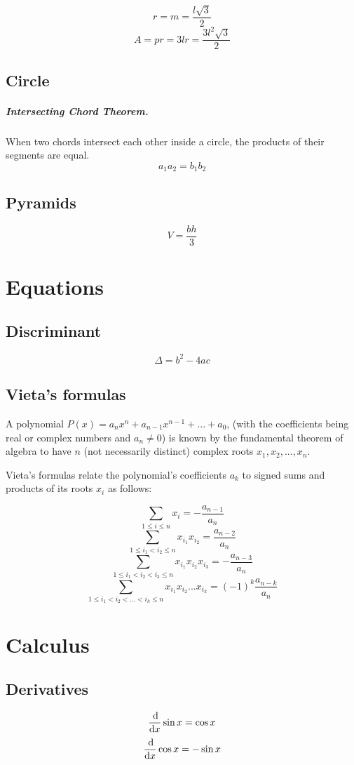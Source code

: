 \documentclass[oneside]{book} %
\theoremstyle{plain}
\begin{document}
\[r = m = \frac{l \sqrt{3}}{2}\]
\[A = pr = 3 l r = \frac{3 l^2 \sqrt{3}}{2}\]

\section{Circle}
\paragraph{Intersecting Chord Theorem.} When two chords intersect each
other inside a circle, the products of their segments are equal.
\[a_1 a_2 = b_1 b_2\]

\section{Pyramids}
\[V = \frac{bh}{3}\]

\chapter{Equations}
\section{Discriminant}
\[\Delta = b^2 - 4ac\]

\section{Vieta's formulas}
A polynomial \(P(x) = a_n x^n + a_{n-1} x^{n-1} + ... + a_0\), (with the
coefficients being real or complex numbers and \(a_n \neq 0\)) is known by the
fundamental theorem of algebra to have \(n\) (not necessarily distinct) complex
roots \(x_1, x_2, ..., x_n\).

Vieta's formulas relate the polynomial's coefficients \(a_k\) to signed sums
and products of its roots \(x_i\) as follows:

\[\sum_{1 \le i \le n} x_i = - \frac{a_{n-1}}{a_n}\]
\[\sum_{1 \le i_1 < i_2 \le n} x_{i_1} x_{i_2} = \frac{a_{n-2}}{a_n}\]
\[\sum_{1 \le i_1 < i_2 < i_3 \le n} x_{i_1} x_{i_2} x_{i_3} = -
\frac{a_{n-3}}{a_n}\]
\[\sum_{1 \le i_1 < i_2 < ... < i_k \le n} x_{i_1} x_{i_2} ... x_{i_k} = (-1)^k
\frac{a_{n-k}}{a_n}\]

\chapter{Calculus}
\section{Derivatives}
\[\frac{\dif}{\dif x} \sin x = \cos x\]
\[\frac{\dif}{\dif x} \cos x = -\sin x\]
\end{document}

